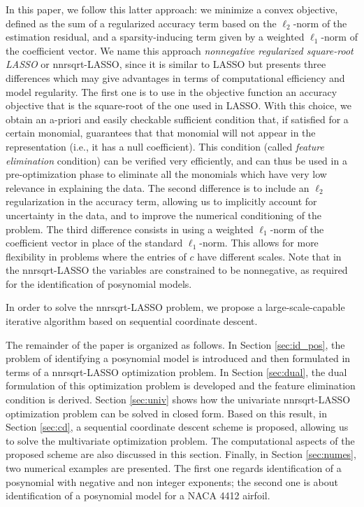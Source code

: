 \documentclass[11pt]{article}
\begin{document}
In this paper, we follow this latter approach: we minimize a convex
objective, defined as the sum of a regularized accuracy term based
on the $\ell_{2}$-norm of the estimation residual, and a sparsity-inducing
term given by a weighted $\ell_{1}$-norm of the coefficient vector.
We name this approach \emph{nonnegative regularized square-root LASSO}
or nnrsqrt-LASSO, since it is similar to LASSO but presents three
differences which may give advantages in terms of computational efficiency
and model regularity. The first one is to use in the objective function
an accuracy objective that is the square-root of the one used in LASSO.
With this choice, we obtain an a-priori and easily checkable sufficient condition
that, if satisfied for a certain monomial, guarantees that that monomial
will not appear in the representation (i.e., it has a null coefficient). 
This condition (called \emph{feature elimination} condition) can be
verified very efficiently, and can thus be used in a pre-optimization
phase to eliminate all the monomials which have very low relevance
in explaining the data. The second difference is to include an $\ell_{2}$
regularization in the accuracy term, allowing us to implicitly account for uncertainty
in the data, and to improve the numerical conditioning of the problem. 
The third difference
consists in using a weighted $\ell_{1}$-norm of the coefficient vector
in place of the standard $\ell_{1}$-norm. This allows for more flexibility
in problems where the entries of $c$ have different scales. Note
that in the nnrsqrt-LASSO the variables are constrained to be nonnegative,
as required for the identification of posynomial models.

In order to solve the nnrsqrt-LASSO problem, we propose a large-scale-capable
iterative algorithm based on sequential coordinate descent.


The remainder of the paper is organized as follows. In Section \ref{sec:id_pos}, the problem
of identifying a posynomial model is introduced and then formulated
in terms of a nnrsqrt-LASSO optimization problem. In Section \ref{sec:dual},
the dual formulation of this optimization problem is developed and
the feature elimination condition is derived. Section \ref{sec:univ}
shows how the univariate nnrsqrt-LASSO optimization problem can be
solved in closed form. Based on this result, in Section \ref{sec:cd},
a sequential coordinate descent scheme is proposed, allowing us
to solve the multivariate optimization problem. The computational
aspects of the proposed scheme are also discussed in this section.
Finally, in Section \ref{sec:numes}, two numerical examples are presented.
The first one regards identification of a posynomial with negative
and non integer exponents; the second one is about identification
of a posynomial model for a NACA 4412 airfoil.
\end{document}
